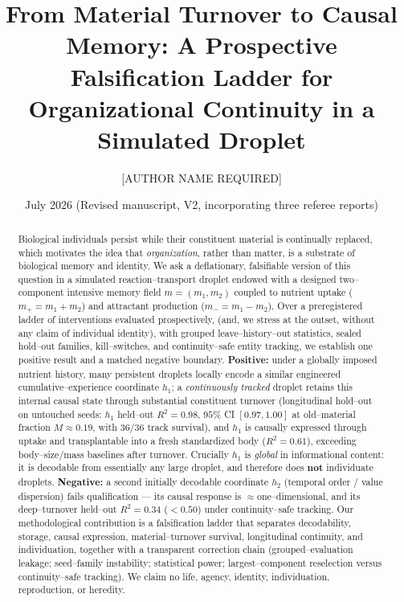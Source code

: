 \documentclass[11pt]{article}
\title{\textbf{From Material Turnover to Causal Memory: A Prospective Falsification Ladder for Organizational Continuity in a Simulated Droplet}}
\author[1]{[AUTHOR NAME REQUIRED]}
\affil[1]{[AFFILIATION REQUIRED] \quad ORCID: [ORCID IF AVAILABLE]}
\date{July 2026 \quad (Revised manuscript, V2, incorporating three referee reports)}
\begin{document}
\maketitle

\begin{abstract}
\noindent Biological individuals persist while their constituent material is continually replaced, which motivates
the idea that \emph{organization}, rather than matter, is a substrate of biological memory and identity. We ask a
deflationary, falsifiable version of this question in a simulated reaction--transport droplet endowed with a designed
two--component intensive memory field $m=(m_1,m_2)$ coupled to nutrient uptake ($m_+=m_1+m_2$) and attractant
production ($m_-=m_1-m_2$). Over a preregistered ladder of interventions evaluated prospectively, (and, we stress at the outset, without any claim of individual identity), with grouped
leave--history--out statistics, sealed hold--out families, kill--switches, and continuity--safe entity tracking, we
establish one positive result and a matched negative boundary. \textbf{Positive:} under a globally imposed nutrient
history, many persistent droplets locally encode a similar engineered cumulative--experience coordinate $h_1$; a
\emph{continuously tracked} droplet retains this internal causal state through substantial constituent turnover
(longitudinal hold--out on untouched seeds: $h_1$ held--out $R^2=0.98$, $95\%$ CI $[0.97,1.00]$ at old--material
fraction $M\approx0.19$, with $36/36$ track survival), and $h_1$ is causally expressed through uptake and
transplantable into a fresh standardized body ($R^2=0.61$), exceeding body--size/mass baselines after turnover.
Crucially $h_1$ is \emph{global} in informational content: it is decodable from essentially any large droplet, and
therefore does \textbf{not} individuate droplets. \textbf{Negative:} a second initially decodable coordinate $h_2$
(temporal order / value dispersion) fails qualification --- its causal response is $\approx$one--dimensional, and its
deep--turnover held--out $R^2=0.34$ ($<0.50$) under continuity--safe tracking. Our methodological contribution is a
falsification ladder that separates decodability, storage, causal expression, material--turnover survival,
longitudinal continuity, and individuation, together with a transparent correction chain (grouped--evaluation
leakage; seed--family instability; statistical power; largest--component reselection versus continuity--safe
tracking). We claim no life, agency, identity, individuation, reproduction, or heredity.
\end{abstract}
\end{document}
